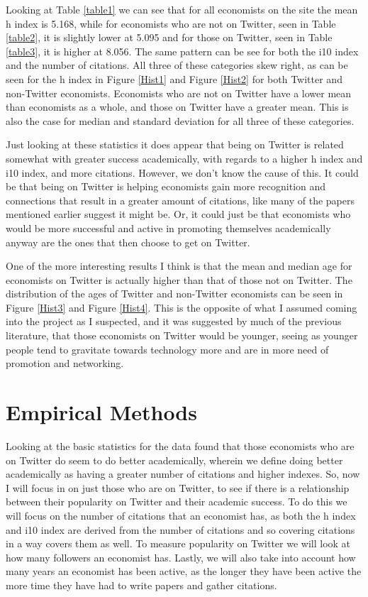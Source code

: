 \documentclass[12pt, Times New Roman]{article}
\begin{document}
Looking at Table \ref{table1} we can see that for all economists on the site the mean h index is 5.168, while for economists who are not on Twitter, seen in Table \ref{table2}, it is slightly lower at 5.095 and for those on Twitter, seen in  Table \ref{table3}, it is higher at 8.056. The same pattern can be see for both the i10 index and the number of citations. All three of these categories skew right, as can be seen for the h index in Figure \ref{Hist1} and Figure \ref{Hist2} for both Twitter and non-Twitter economists. Economists who are not on Twitter have a lower mean than economists as a whole, and those on Twitter have a greater mean. This is also the case for median and standard deviation for all three of these categories. 

Just looking at these statistics it does appear that being on Twitter is related somewhat with greater success academically, with regards to a higher h index and i10 index, and more citations. However, we don’t know the cause of this. It could be that being on Twitter is helping economists gain more recognition and connections that result in a greater amount of citations, like many of the papers mentioned earlier suggest it might be. Or, it could just be that economists who would be more successful and active in promoting themselves academically anyway are the ones that then choose to get on Twitter. 

One of the more interesting results I think is that the mean and median age for economists on Twitter is actually higher than that of those not on Twitter. The distribution of the ages of Twitter and non-Twitter economists can be seen in Figure \ref{Hist3} and Figure \ref{Hist4}. This is the opposite of what I assumed coming into the project as I suspected, and it was suggested by much of the previous literature, that those economists on Twitter would be younger, seeing as younger people tend to gravitate towards technology more and are in more need of promotion and networking.

\section*{Empirical Methods}\label{sec:methods}

Looking at the basic statistics for the data found that those economists who are on Twitter do seem to do better academically, wherein we define doing better academically as having a greater number of citations and higher indexes. So, now I will focus in on just those who are on Twitter, to see if there is a relationship between their popularity on Twitter and their academic success. To do this we will focus on the number of citations that an economist has, as both the h index and i10 index are derived from the number of citations and so covering citations in a way covers them as well. To measure popularity on Twitter we will look at how many followers an economist has. Lastly, we will also take into account how many years an economist has been active, as the longer they have been active the more time they have had to write papers and gather citations.
\end{document}
